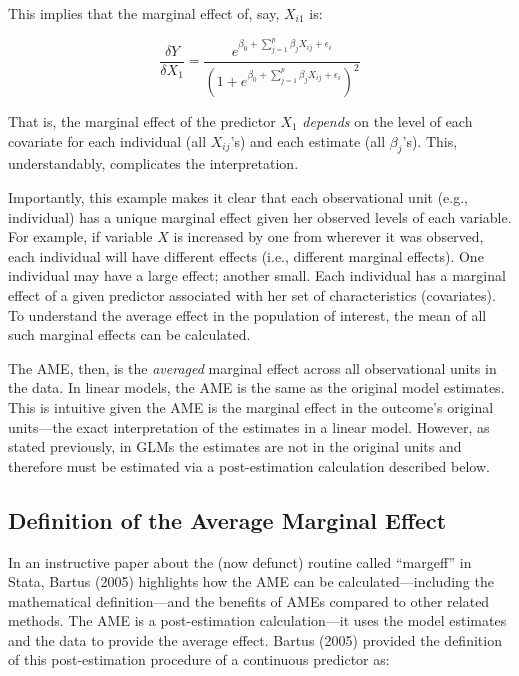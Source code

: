 \documentclass[]{DissertateUSU}
\begin{document}
\noindent This implies that the marginal effect of, say, \(X_{i1}\) is:

\begin{equation}\label{marginallogistic}
\frac{\delta Y}{\delta X_1} = \frac{e^{\beta_0 + \sum_{j=1}^p \beta_{j} X_{ij} + \epsilon_i}}{(1 + e^{\beta_0 + \sum_{j=1}^p \beta_{j} X_{ij} + \epsilon_i})^2}
\end{equation}

\noindent That is, the marginal effect of the predictor \(X_1\)
\emph{depends} on the level of each covariate for each individual (all
\(X_{ij}\)'s) and each estimate (all \(\beta_j\)'s). This,
understandably, complicates the interpretation.

Importantly, this example makes it clear that each observational unit
(e.g., individual) has a unique marginal effect given her observed
levels of each variable. For example, if variable \(X\) is increased by
one from wherever it was observed, each individual will have different
effects (i.e., different marginal effects). One individual may have a
large effect; another small. Each individual has a marginal effect of a
given predictor associated with her set of characteristics (covariates).
To understand the average effect in the population of interest, the mean
of all such marginal effects can be calculated.

The AME, then, is the \emph{averaged} marginal effect across all
observational units in the data. In linear models, the AME is the same
as the original model estimates. This is intuitive given the AME is the
marginal effect in the outcome's original units---the exact
interpretation of the estimates in a linear model. However, as stated
previously, in GLMs the estimates are not in the original units and
therefore must be estimated via a post-estimation calculation described
below.

\subsection{Definition of the Average Marginal
Effect}\label{definition-of-the-average-marginal-effect}

In an instructive paper about the (now defunct) routine called
``margeff'' in Stata, Bartus (2005) highlights how the AME can be
calculated---including the mathematical definition---and the benefits of
AMEs compared to other related methods. The AME is a post-estimation
calculation---it uses the model estimates and the data to provide the
average effect. Bartus (2005) provided the definition of this
post-estimation procedure of a continuous predictor as:
\end{document}
